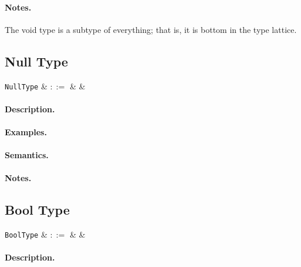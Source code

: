 \paragraph{Notes.} The void type is a subtype of everything; that is, it is bottom in the type lattice.


\subsection{Null Type}

\begin{syntax}
  \verb+NullType+ & $::=$ &  &\\
\end{syntax}

\paragraph{Description.}

\paragraph{Examples.}

\paragraph{Semantics.}

\paragraph{Notes.} 


\subsection{Bool Type}

\begin{syntax}
 \verb+BoolType+ & $::=$ &  &\\
\end{syntax}

\paragraph{Description.}

